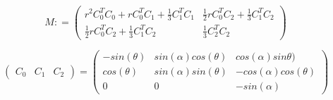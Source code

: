 \begin{equation}  
M: = 
    \left(
    \begin{matrix}
        r^2C_0^T C_0 + rC_0^T C_1 + \frac{1}{3} C_1^T C_1 &
        \frac{1}{2} r C_0^T C_2 + \frac{1}{3} C_1^TC_2 \\
        \frac{1}{2} r C_0^T C_2 + \frac{1}{3} C_1^TC_2   &
        \frac{1}{3} C_2^T C_2
    \end{matrix}
    \right)
\end{equation}


\begin{equation}
    \left( \begin{matrix}
        C_0 & C_1 & C_2
    \end{matrix} \right)
   =
        \left(  \begin{matrix} 
        -sin(\theta) &   sin(\alpha) cos(\theta) & cos(\alpha) sin\theta) \\
        cos(\theta) & sin(\alpha) sin(\theta) &  - cos(\alpha) cos(\theta) \\
        0 &  0 &- sin(\alpha)
    \end{matrix}\right) 
\end{equation}
